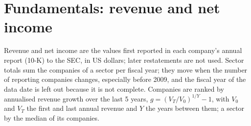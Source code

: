 \documentclass[11pt,a4paper]{article}
\begin{document}
\section{Fundamentals: revenue and net income}
\label{sec:fundamentals}
Revenue and net income are the values first reported in each company's annual report (10-K) to the SEC, in US dollars; later restatements are not used. Sector totals sum the companies of a sector per fiscal year; they move when the number of reporting companies changes, especially before 2009, and the fiscal year of the data date is left out because it is not complete. Companies are ranked by annualised revenue growth over the last 5 years, $g = (V_T / V_0)^{1/Y} - 1$, with $V_0$ and $V_T$ the first and last annual revenue and $Y$ the years between them; a sector by the median of its companies.
\end{document}
